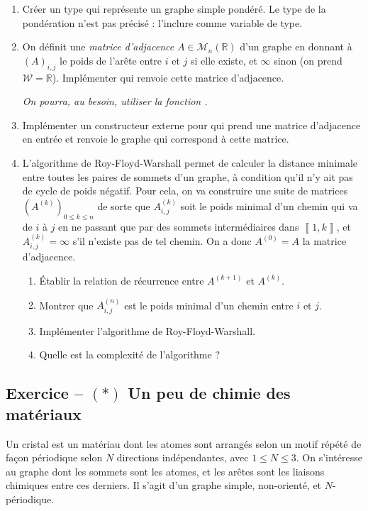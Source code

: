 \documentclass{article}
\newcounter{loop}
\newcounter{numEx}
\newcommand{\exo}[1]{
	\stepcounter{numEx}
	\setcounter{loop}{0}
	\subsection*{Exercice \arabic{numEx} -- #1}
}
\newcommand{\llbra}{\left\llbracket}
\newcommand{\rrbra}{\right\rrbracket}
\renewcommand{\brack}[1]{\ensuremath{\llbra#1\rrbra}}
\newcommand{\der}[2]{#1^{\ensuremath{\left(#2\right)}}}
\newcommand{\paren}[1]{\ensuremath{\left(#1\right)}}
\newcommand{\matr}[2]{\mathcal{M}_{#1}\paren{#2}}
\newcommand{\R}{\mathbb{R}}
\begin{document}
\begin{enumerate}
	\item Créer un type  qui représente un graphe simple pondéré. Le type de la pondération n'est pas précisé : l'inclure comme variable de type.

	\item On définit une \emph{matrice d'adjacence} $A\in\matr n\R$ d'un graphe en donnant à $(A)_{i,j}$ le poids de l'arête entre $i$ et $j$ si elle existe, et $\infty$ sinon (on prend $\mathcal W = \R$). Implémenter  qui renvoie cette matrice d'adjacence.

	\textsl{On pourra, au besoin, utiliser la fonction .}

	\item Implémenter un constructeur externe pour  qui prend une matrice d'adjacence en entrée et renvoie le graphe qui correspond à cette matrice.
	
	\item L'algorithme de Roy-Floyd-Warshall permet de calculer la distance minimale entre toutes les paires de sommets d'un graphe, à condition qu'il n'y ait pas de cycle de poids négatif. Pour cela, on va construire une suite de matrices $\paren{\der Ak}_{0\le k\le n}$ de sorte que $\der Ak_{i,j}$ soit le poids minimal d'un chemin qui va de $i$ à $j$ en ne passant que par des sommets intermédiaires dans $\brack{1,k}$, et $\der Ak_{i,j} = \infty$ s'il n'existe pas de tel chemin. On a donc $\der A0 = A$ la matrice d'adjacence.
	\begin{enumerate}
		\item Établir la relation de récurrence entre $\der A{k+1}$ et $\der Ak$.
		\item Montrer que $\der An_{i,j}$ est le poids minimal d'un chemin entre $i$ et $j$.
		\item Implémenter l'algorithme de Roy-Floyd-Warshall.
		\item Quelle est la complexité de l'algorithme ?
	\end{enumerate}
\end{enumerate}


\exo{$(*)$ Un peu de chimie des matériaux}

Un cristal est un matériau dont les atomes sont arrangés selon un motif répété de façon périodique selon $N$ directions indépendantes, avec $1\le N\le3$. On s'intéresse au graphe dont les sommets sont les atomes, et les arêtes sont les liaisons chimiques entre ces derniers. Il s'agit d'un graphe simple, non-orienté, et $N$-périodique.
\end{document}
